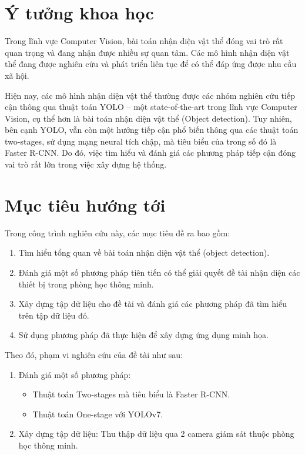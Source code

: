 \section{Ý tưởng khoa học}
Trong lĩnh vực Computer Vision, bài toán nhận diện vật thể đóng vai trò rất quan trọng và đang nhận được nhiều sự quan tâm. Các mô hình nhận diện vật thể đang được nghiên cứu và phát triển liên tục để có thể đáp ứng được nhu cầu xã hội.

Hiện nay, các mô hình nhận diện vật thể thường được các nhóm nghiên cứu tiếp cận thông qua thuật toán YOLO – một state-of-the-art trong lĩnh vực Computer Vision, cụ thể hơn là bài toán nhận diện vật thể (Object detection). Tuy nhiên, bên cạnh YOLO, vẫn còn một hướng tiếp cận phổ biến thông qua các thuật toán two-stages, sử dụng mạng neural tích chập, mà tiêu biểu của trong số đó là Faster R-CNN. Do đó, việc tìm hiểu và đánh giá các phương pháp tiếp cận đóng vai trò rất lớn trong việc xây dựng hệ thống.


\section{Mục tiêu hướng tới}
Trong công trình nghiên cứu này, các mục tiêu đề ra bao gồm:

\begin{enumerate}
	\itemsep0em 
	\item Tìm hiểu tổng quan về bài toán nhận diện vật thể (object detection).
	\item Đánh giá một số phương pháp tiên tiến có thể giải quyết đề tài nhận diện các thiết bị trong phòng học thông minh.
	\item Xây dựng tập dữ liệu cho đề tài và đánh giá các phương pháp đã tìm hiểu trên tập dữ liệu đó.  
	\item Sử dụng phương pháp đã thực hiện để xây dựng ứng dụng minh họa.
\end{enumerate}

Theo đó, phạm vi nghiên cứu của đề tài như sau:
\begin{enumerate}
	\itemsep0em 
	\item Đánh giá một số phương pháp:
	\begin{itemize}
		\itemsep0em 
		\item Thuật toán Two-stages mà tiêu biểu là Faster R-CNN.
		\item Thuật toán One-stage với YOLOv7.
	\end{itemize}
	\item Xây dựng tập dữ liệu: Thu thập dữ liệu qua 2 camera giám sát thuộc phòng học thông minh. 
\end{enumerate}

